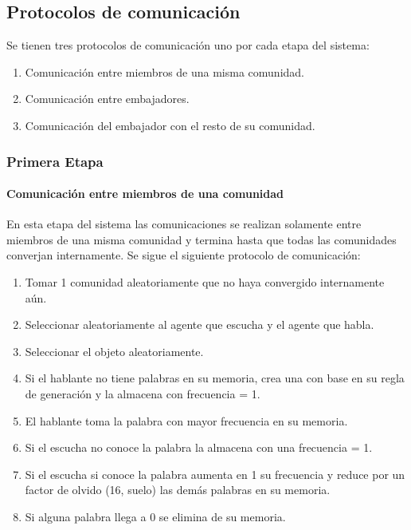 \documentclass[runningheads]{llncs}
\begin{document}
\subsection{Protocolos de comunicación}

Se tienen tres protocolos de comunicación uno por cada etapa del sistema:

\begin{enumerate}
	\item Comunicación entre miembros de una misma comunidad.
	\item Comunicación entre embajadores.
	\item Comunicación del embajador con el resto de su comunidad.
\end{enumerate}
\subsubsection{Primera Etapa}
\paragraph{Comunicación entre miembros de una comunidad}
En esta etapa del sistema las comunicaciones se realizan solamente entre miembros de una misma comunidad y termina hasta que todas las comunidades converjan internamente.
Se sigue el siguiente protocolo de comunicación:
\begin{enumerate}
	\item Tomar 1 comunidad aleatoriamente que no haya convergido internamente aún.
	\item Seleccionar aleatoriamente al agente que escucha y el agente que habla.
	\item Seleccionar el objeto aleatoriamente.
	\item Si el hablante no tiene palabras en su memoria, crea una con base en su regla de generación y la almacena con frecuencia = 1.
	\item El hablante toma la palabra con mayor frecuencia en su memoria.
	\item Si el escucha no conoce la palabra la almacena con una frecuencia = 1.
	\item Si el escucha si conoce la palabra aumenta en 1 su frecuencia y reduce por un factor de olvido (16, suelo) las demás palabras en su memoria.
	\item Si alguna palabra llega a 0 se elimina de su memoria. 
\end{enumerate}
\end{document}
